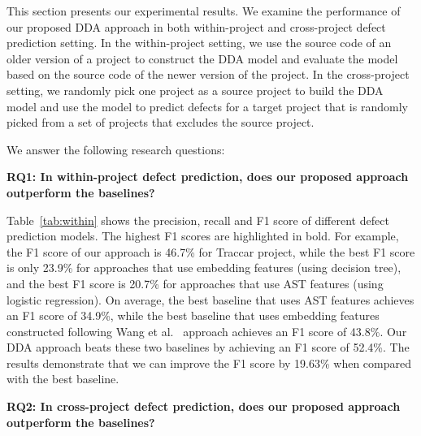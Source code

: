 This section presents our experimental results. We examine the performance of our proposed DDA approach in both within-project and cross-project defect prediction setting. In the within-project setting, we use the source code of an older version of a project to construct the DDA model and evaluate the model based on the source code of the newer version of the project. In the cross-project setting, we randomly pick one project as a source project to build the DDA model and use the model to predict defects for a target project that is randomly picked from a set of projects that excludes the source project.

We answer the following research questions: 

\textbf{RQ1: In within-project defect prediction, does our proposed approach outperform the baselines?}

Table~\ref{tab:within} shows the precision, recall and F1 score of different defect prediction models. The highest F1 scores are highlighted in bold. For example, the F1 score of our approach is 46.7\% for Traccar project, while the best F1 score is only 23.9\% for approaches that use embedding features (using decision tree), and the best F1 score is 20.7\% for approaches that use AST features (using logistic regression). On average, the best baseline that uses AST features achieves an F1 score of 34.9\%, while the best baseline that uses embedding features constructed following Wang et al.~\cite{wang2016automatically} approach achieves an F1 score of 43.8\%. Our DDA approach beats these two baselines by achieving an F1 score of 52.4\%. The results demonstrate that we can improve the F1 score by 19.63\% when compared with the best baseline. 


\textbf{RQ2: In cross-project defect prediction, does our proposed approach outperform the baselines?}

